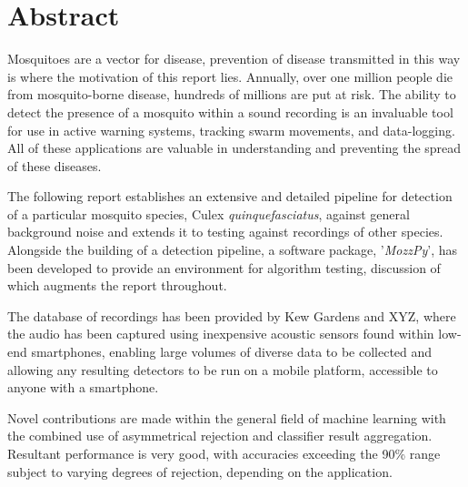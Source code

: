 \section*{Abstract}
    Mosquitoes are a vector for disease, prevention of disease transmitted in this way is where the motivation of this report lies. Annually, over one million people die from mosquito-borne disease, hundreds of millions are put at risk. The ability to detect the presence of a mosquito within a sound recording is an invaluable tool for use in active warning systems, tracking swarm movements, and data-logging. All of these applications are valuable in understanding and preventing the spread of these diseases. 
    
    The following report establishes an extensive and detailed pipeline for detection of a particular mosquito species, Culex \textit{quinquefasciatus}, against general background noise and extends it to testing against recordings of other species. Alongside the building of a detection pipeline, a software package, '\textit{MozzPy}', has been developed to provide an environment for algorithm testing, discussion of which augments the report throughout.
    
    The database of recordings has been provided by Kew Gardens and XYZ, where the audio has been captured using inexpensive acoustic sensors found within low-end smartphones, enabling large volumes of diverse data to be collected and allowing any resulting detectors to be run on a mobile platform, accessible to anyone with a smartphone.
    
    Novel contributions are made within the general field of machine learning with the combined use of asymmetrical rejection and classifier result aggregation. Resultant performance is very good, with accuracies exceeding the 90\% range subject to varying degrees of rejection, depending on the application.
